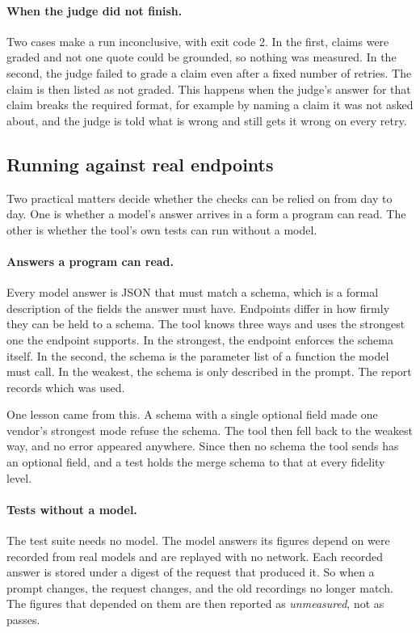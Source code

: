 \paragraph{When the judge did not finish.} Two cases make a run inconclusive, with exit code 2. In the first, claims were graded and not one quote could be grounded, so nothing was measured. In the second, the judge failed to grade a claim even after a fixed number of retries. The claim is then listed as not graded. This happens when the judge's answer for that claim breaks the required format, for example by naming a claim it was not asked about, and the judge is told what is wrong and still gets it wrong on every retry.

\subsection{Running against real endpoints}

Two practical matters decide whether the checks can be relied on from day to day. One is whether a model's answer arrives in a form a program can read. The other is whether the tool's own tests can run without a model.

\paragraph{Answers a program can read.} Every model answer is JSON that must match a schema, which is a formal description of the fields the answer must have. Endpoints differ in how firmly they can be held to a schema. The tool knows three ways and uses the strongest one the endpoint supports. In the strongest, the endpoint enforces the schema itself. In the second, the schema is the parameter list of a function the model must call. In the weakest, the schema is only described in the prompt. The report records which was used.

One lesson came from this. A schema with a single optional field made one vendor's strongest mode refuse the schema. The tool then fell back to the weakest way, and no error appeared anywhere. Since then no schema the tool sends has an optional field, and a test holds the merge schema to that at every fidelity level.

\paragraph{Tests without a model.} The test suite needs no model. The model answers its figures depend on were recorded from real models and are replayed with no network. Each recorded answer is stored under a digest of the request that produced it. So when a prompt changes, the request changes, and the old recordings no longer match. The figures that depended on them are then reported as \emph{unmeasured}, not as passes.
